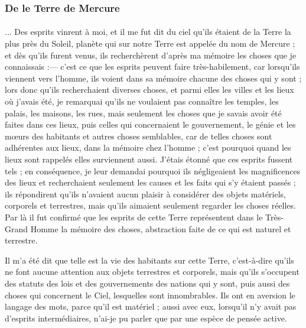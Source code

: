 \documentclass[a4paper, 11pt, oneside, landscape]{article}
\begin{document}
\subsubsection{De le Terre de Mercure}
\paragraph{}
... Des esprits vinrent à moi, et il me fut dit du ciel qu'ils étaient de la Terre la plus près du Soleil, planète qui sur notre Terre est appelée du nom de Mercure ; et dès qu'ils furent venus, ils recherchèrent d'après ma mémoire les choses que je connaissais :--- c'est ce que les esprits peuvent faire très-habilement, car lorsqu'ils viennent vers l'homme, ils voient dans sa mémoire chacune des choses qui y sont ; lors donc qu'ils recherchaient diverses choses, et parmi elles les villes et les lieux où j'avais été, je remarquai qu'ils ne voulaient pas connaître les temples, les palais, les maisons, les rues, mais seulement les choses que je savais avoir été faites dans ces lieux, puis celles qui concernaient le gouvernement, le génie et les mœurs des habitants et autres choses semblables, car de telles choses sont adhérentes aux lieux, dans la mémoire chez l'homme ; c'est pourquoi quand les lieux sont rappelés elles surviennent aussi. J'étais étonné que ces esprits fussent tels ; en conséquence, je leur demandai pourquoi ils négligeaient les magnificences des lieux et recherchaient seulement les causes et les faits qui s'y étaient passés ; ils répondirent qu'ils n'avaient aucun plaisir à considérer des objets matériels, corporels et terrestres, mais qu'ils aimaient seulement regarder les choses réelles. Par là il fut confirmé que les esprits de cette Terre représentent dans le Très-Grand Homme la mémoire des choses, abstraction faite de ce qui est naturel et terrestre.

Il m'a été dit que telle est la vie des habitants sur cette Terre, c'est-à-dire qu'ils ne font aucune attention aux objets terrestres et corporels, mais qu'ils s'occupent des statuts des lois et des gouvernements des nations qui y sont, puis aussi des choses qui concernent le Ciel, lesquelles sont innombrables. Ils ont en aversion le langage des mots, parce qu'il est matériel ; aussi avec eux, lorsqu'il n'y avait pas d'esprits intermédiaires, n'ai-je pu parler que par une espèce de pensée active.
\end{document}
